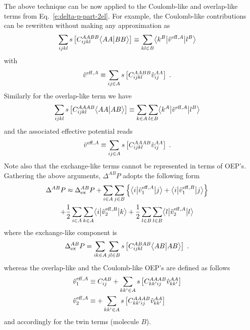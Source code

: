 The above technique can be now applied to the Coulomb\hyp{}like and overlap\hyp{}like 
terms from Eq.~\eqref{e:delta-p-part-2el}. For example, the Coulomb\hyp{}like contributions
can be rewritten without making any approximation as
%
\begin{equation}
 \sum_{ijkl} 
	{s} \left[ C^{AABB}_{ijkl} \bigl\langle {AA} \bigl\lvert {BB} \bigr\rangle \right]
 \equiv
	\sum_{kl\in B} 
	\bigl\langle {k^B} \bigl\lvert {\hat{v}^{{\rm eff},A}} \bigl\lvert {l^B} \bigr\rangle
\end{equation}
%
with
%
\begin{equation}
 \hat{v}^{{\rm eff},A} 
	\equiv \sum_{ij\in A} {s} \left[ C^{AABB}_{ijkl} \hat{v}^{AA}_{ij} \right]  \;.
\end{equation}
%
Similarly for the overlap\hyp{}like term we have
%
\begin{equation}
 \sum_{ijkl} 
	{s} \left[ C^{AAAB}_{ijkl} \bigl\langle {AA} \bigl\lvert {AB} \bigr\rangle \right]
 \equiv
	\sum_{k\in A} \sum_{l\in B} 
	\bigl\langle {k^A} \bigl\lvert {\hat{v}^{{\rm eff},A}} \bigl\lvert {l^B} \bigr\rangle
\end{equation}
%
and the associated effective potential reads
%
\begin{equation}
 \hat{v}^{{\rm eff},A} 
	\equiv \sum_{ij\in A} {s} \left[ C^{AAAB}_{ijkl} \hat{v}^{AA}_{ij} \right] \;.
\end{equation}
%
Note also that the exchange\hyp{}like terms cannot be represented in terms of OEP's.
Gathering the above arguments, $\Delta^{AB}P$ adopts the following form
%
\begin{multline}
 \Delta^{AB}P \approx \Delta_{\rm ex}^{AB} P
	+ \sum_{i\in A} \sum_{j\in B} 
	\left\{
	  \bigl\langle {i} \bigl\lvert {\hat{v}^{{\rm eff},A}_1 } \bigl\lvert {j} \bigr\rangle
	+ \bigl\langle {i} \bigl\lvert {\hat{v}^{{\rm eff},B}_1 } \bigl\lvert {j} \bigr\rangle
	\right\} \\ +
	\frac{1}{2}
	\sum_{i\in A} \sum_{k\in A}
	  \bigl\langle {i} \bigl\lvert {\hat{v}^{{\rm eff},B}_2 } \bigl\lvert {k} \bigr\rangle
	 +
	 \frac{1}{2}
        \sum_{l\in B} \sum_{l\in B}
          \bigl\langle {l} \bigl\lvert {\hat{v}^{{\rm eff},A}_2 } \bigl\lvert {l} \bigr\rangle
\end{multline}
%
where the exchange\hyp{}like component is
%
\begin{equation}
	\Delta_{\rm ex}^{AB} P = 
	\sum_{ik\in A} \sum_{jl\in B}
	{s} \left[ C^{ABAB}_{ijkl} \bigl\langle {AB} \bigl\lvert {AB} \bigr\rangle \right] \;.
\end{equation}
%
whereas
the overlap\hyp{}like and the Coulomb\hyp{}like 
OEP's are defined as follows
%
\begin{align}
	\hat{v}^{{\rm eff},A}_1 &\equiv C_{ij}^{AB} 
	+ \sum_{kk'\in A} {s} \left[ C^{AAAB}_{kk'ij} \hat{v}_{kk'}^{AA} \right] \\
	\hat{v}^{{\rm eff},A}_2 &\equiv 
	+ \sum_{kk'\in A} {s} \left[ C^{AAAB}_{kk'ij} \hat{v}_{kk'}^{AA} \right] \\
\end{align}
%
and accordingly for the twin terms (molecule $B$).

